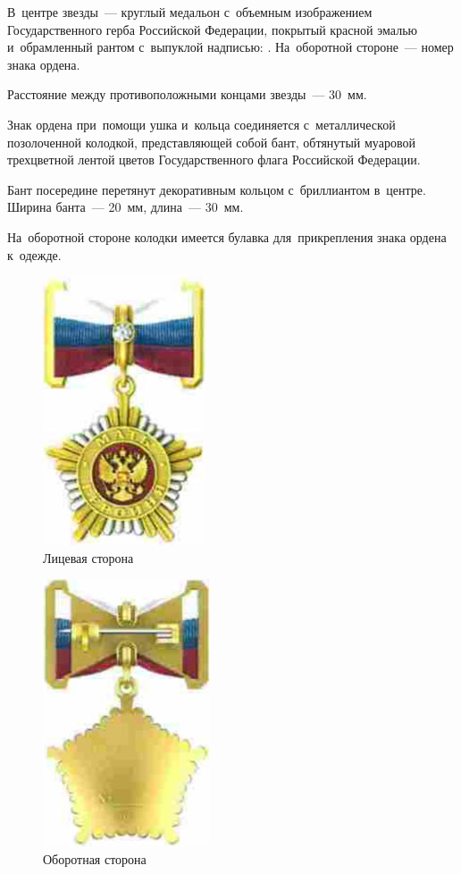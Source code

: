 \documentclass{../president-decree}
\begin{document}
	В~центре звезды~--- круглый медальон с~объемным изображением Государственного герба Российской Федерации, покрытый красной эмалью и~обрамленный рантом с~выпуклой надписью: . На~оборотной стороне~--- номер знака ордена.
	
	Расстояние между противоположными концами звезды~--- 30~мм.
	
	Знак ордена при~помощи ушка и~кольца соединяется с~металлической позолоченной колодкой, представляющей собой бант, обтянутый муаровой трехцветной лентой цветов Государственного флага Российской Федерации.
	
	Бант посередине перетянут декоративным кольцом с~бриллиантом в~центре. Ширина банта~--- 20~мм, длина~--- 30~мм.
	
	На~оборотной стороне колодки имеется булавка для~прикрепления знака ордена к~одежде.
\eaddition


	\begin{figure}[H]
		\centering
		\includegraphics{./figures/medal-front}
		\caption{Лицевая сторона}
	\end{figure}
	\begin{figure}[H]
		\centering
		\includegraphics{./figures/medal-back}
		\caption{Оборотная сторона}
	\end{figure}
\eaddition
\end{document}
